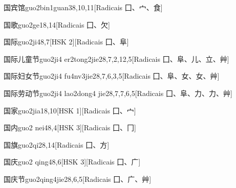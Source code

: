 \begin{entry}{国宾馆}{guo2bin1guan3}{8,10,11}[Radicais ⼞、⼧、⾷]
\end{entry}

\begin{entry}{国歌}{guo2ge1}{8,14}[Radicais ⼞、⽋]
\end{entry}

\begin{entry}{国际}{guo2ji4}{8,7}[HSK 2][Radicais ⼞、⾩]
\end{entry}

\begin{entry}{国际儿童节}{guo2ji4 er2tong2jie2}{8,7,2,12,5}[Radicais ⼞、⾩、⼉、⽴、⾋]
\end{entry}

\begin{entry}{国际妇女节}{guo2ji4 fu4nv3jie2}{8,7,6,3,5}[Radicais ⼞、⾩、⼥、⼥、⾋]
\end{entry}

\begin{entry}{国际劳动节}{guo2ji4 lao2dong4 jie2}{8,7,7,6,5}[Radicais ⼞、⾩、⼒、⼒、⾋]
\end{entry}

\begin{entry}{国家}{guo2jia1}{8,10}[HSK 1][Radicais ⼞、⼧]
\end{entry}

\begin{entry}{国内}{guo2 nei4}{8,4}[HSK 3][Radicais ⼞、⼌]
\end{entry}

\begin{entry}{国旗}{guo2qi2}{8,14}[Radicais ⼞、⽅]
\end{entry}

\begin{entry}{国庆}{guo2 qing4}{8,6}[HSK 3][Radicais ⼞、⼴]
\end{entry}

\begin{entry}{国庆节}{guo2qing4jie2}{8,6,5}[Radicais ⼞、⼴、⾋]
\end{entry}

